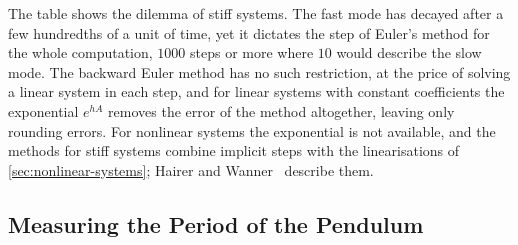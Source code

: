 \begin{table}
\end{table}

The table shows the dilemma of stiff systems. The fast mode has decayed after a few hundredths of a unit of time, yet it dictates the step of Euler's method for the whole computation, $1000$ steps or more where $10$ would describe the slow mode. The backward Euler method has no such restriction, at the price of solving a linear system in each step, and for linear systems with constant coefficients the exponential $e^{hA}$ removes the error of the method altogether, leaving only rounding errors. For nonlinear systems the exponential is not available, and the methods for stiff systems combine implicit steps with the linearisations of \cref{sec:nonlinear-systems}; Hairer and Wanner~\cite{hairer1996stiff} describe them.

\subsection{Measuring the Period of the Pendulum}

